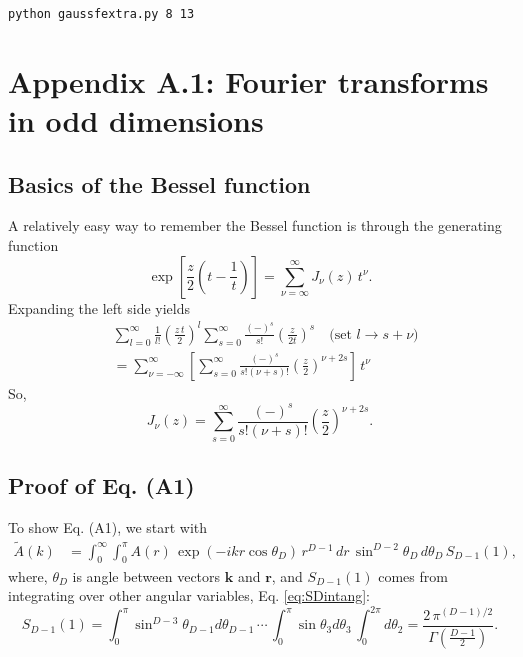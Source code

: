 \documentclass[preprint]{revtex4-1}
\numberwithin{equation}{subsection}
\numberwithin{table}{section}
\newcommand{\vct}[1]{\mathbf{#1}}
\providecommand{\vr}{} %
\renewcommand{\vr}{\vct{r}}
\newcommand{\vk}{\vct{k}}
\begin{document}
\qquad\texttt{python gaussfextra.py 8 13}



\section{Appendix A.1: Fourier transforms in odd dimensions}



\subsection{Basics of the Bessel function}



A relatively easy way to remember the Bessel function
is through the generating function
\[
  \exp\left[ \frac{z}{2} \left(t - \frac{1}{t}\right) \right]
  =
  \sum_{\nu = \infty}^\infty J_\nu(z) \, t^\nu.
\]
%
Expanding the left side yields
\begin{align*}
&
  \sum_{l = 0}^\infty \frac{ 1 } { l! } \left( \frac {z \, t} 2\right)^l
  \sum_{s = 0}^\infty \frac{ (-)^s } { s! }
    \left( \frac z {2t} \right)^s
  \quad \mbox{(set $l \rightarrow s + \nu$)} \\
&=
  \sum_{\nu = -\infty}^\infty
  \left[
  \sum_{s = 0}^\infty
  \frac { (-)^s } {s! (\nu + s)! }
  \left( \frac z 2 \right)^{\nu + 2s}
  \right]
  \, t^\nu
\end{align*}
So,
\begin{equation}
  J_\nu(z)
=
  \sum_{s = 0}^\infty
  \frac{ (-)^s } { s! (\nu + s)! }
  \left( \frac z 2 \right)^{\nu + 2s}.
  \label{eq:bessel}
\end{equation}



\subsection{Proof of Eq. (A1)}



To show Eq. (A1), we start with
%
\begin{align}
  \tilde A(k)
&=
  \int_0^\infty
  \int_0^\pi
  A(r) \, \exp(-ikr \cos \theta_D) \,
    r^{D-1} \, dr \,
    \sin^{D-2} \theta_D \,
    d\theta_D \, S_{D-1}(1),
\label{eq:Aksphr}
\end{align}
%
where,
$\theta_D$ is angle between vectors $\vk$ and $\vr$,
and
$S_{D-1}(1)$ comes from integrating over other angular variables,
Eq. \eqref{eq:SDintang}:
\[
  S_{D-1}(1)
=
\int_0^\pi \sin^{D-3} \theta_{D-1} d\theta_{D-1} \,
\cdots \,
\int_0^\pi \sin \theta_3 d\theta_3 \,
\int_0^{2\pi} d\theta_2
=
\frac{2 \, \pi^{(D-1)/2} } { \Gamma\left( \frac{D-1} 2 \right) }.
\]
%
\end{document}
